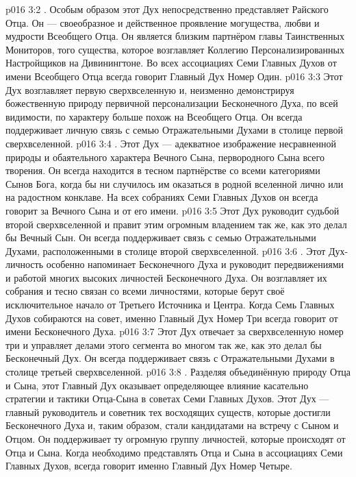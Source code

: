 \vs p016 3:2 . Особым образом этот Дух непосредственно представляет Райского Отца. Он --- своеобразное и действенное проявление могущества, любви и мудрости Всеобщего Отца. Он является близким партнёром главы Таинственных Мониторов, того существа, которое возглавляет Коллегию Персонализированных Настройщиков на Дивинингтоне. Во всех ассоциациях Семи Главных Духов от имени Всеобщего Отца всегда говорит Главный Дух Номер Один.
\vs p016 3:3 Этот Дух возглавляет первую сверхвселенную и, неизменно демонстрируя божественную природу первичной персонализации Бесконечного Духа, по всей видимости, по характеру больше похож на Всеобщего Отца. Он всегда поддерживает личную связь с семью Отражательными Духами в столице первой сверхвселенной.
\vs p016 3:4 \pc {}. Этот Дух --- адекватное изображение несравненной природы и обаятельного характера Вечного Сына, первородного Сына всего творения. Он всегда находится в тесном партнёрстве со всеми категориями Сынов Бога, когда бы ни случилось им оказаться в родной вселенной лично или на радостном конклаве. На всех собраниях Семи Главных Духов он всегда говорит за Вечного Сына и от его имени.
\vs p016 3:5 Этот Дух руководит судьбой второй сверхвселенной и правит этим огромным владением так же, как это делал бы Вечный Сын. Он всегда поддерживает связь с семью Отражательными Духами, расположенными в столице второй сверхвселенной.
\vs p016 3:6 \pc {}. Этот Дух\hyp{}личность особенно напоминает Бесконечного Духа и руководит передвижениями и работой многих высоких личностей Бесконечного Духа. Он возглавляет их собрания и тесно связан со всеми личностями, которые берут своё исключительное начало от Третьего Источника и Центра. Когда Семь Главных Духов собираются на совет, именно Главный Дух Номер Три всегда говорит от имени Бесконечного Духа.
\vs p016 3:7 Этот Дух отвечает за сверхвселенную номер три и управляет делами этого сегмента во многом так же, как это делал бы Бесконечный Дух. Он всегда поддерживает связь с Отражательными Духами в столице третьей сверхвселенной.
\vs p016 3:8 \pc {}. Разделяя объединённую природу Отца и Сына, этот Главный Дух оказывает определяющее влияние касательно стратегии и тактики Отца\hyp{}Сына в советах Семи Главных Духов. Этот Дух --- главный руководитель и советник тех восходящих существ, которые достигли Бесконечного Духа и, таким образом, стали кандидатами на встречу с Сыном и Отцом. Он поддерживает ту огромную группу личностей, которые происходят от Отца и Сына. Когда необходимо представлять Отца и Сына в ассоциациях Семи Главных Духов, всегда говорит именно Главный Дух Номер Четыре.
